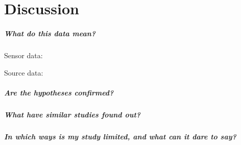 \chapter{Discussion}

\paragraph{What do this data mean?}
Sensor data:

Source data:


\paragraph{Are the hypotheses confirmed?}

\paragraph{What have similar studies found out?}

\paragraph{In which ways is my study limited, and what can it dare to say?}